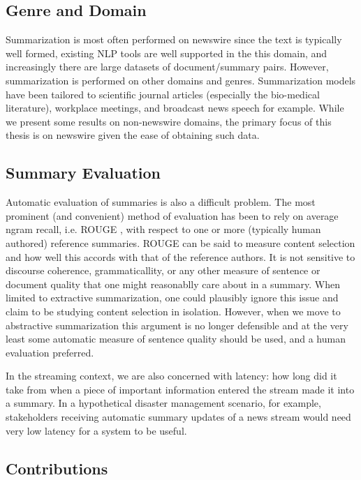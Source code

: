 \subsection{Genre and Domain}
Summarization is most often performed on newswire since the text is 
typically well formed, existing NLP tools are well supported in the this 
domain, and increasingly there are large datasets of document/summary pairs.
However, summarization is performed on other domains and genres. 
Summarization models have been tailored to scientific
journal articles (especially the bio-medical literature), workplace meetings,
and broadcast news speech for example.
While we present some results on non-newswire domains, the primary 
focus of this thesis is on newswire given the ease of obtaining such data. 



\subsection{Summary Evaluation}
Automatic evaluation of summaries is also a difficult problem.
The most prominent (and convenient) method of evaluation has been
to rely on average ngram recall, i.e. ROUGE \cite{rougepeople},
with respect to one or more (typically human authored) reference
summaries. ROUGE can be said to measure content selection and
how well this accords with that of the reference authors.
It is not sensitive to discourse coherence, grammaticallity,
or any other measure of sentence or document quality
that one might reasonablly care about in a summary.
When limited to extractive summarization, one could plausibly 
ignore this issue and claim to be studying content selection in
isolation. However, when we move to abstractive summarization
this argument is no longer defensible and at the very least
some automatic measure of sentence quality should be used,
and a human evaluation preferred.

In the streaming context, we are also concerned with latency:
how long did it take from when a piece of important 
information entered the stream made it into a summary.
In a hypothetical disaster management scenario, for example,
stakeholders receiving automatic summary updates of a news
stream would need very low latency for a system to be useful.


\subsection{Contributions}

